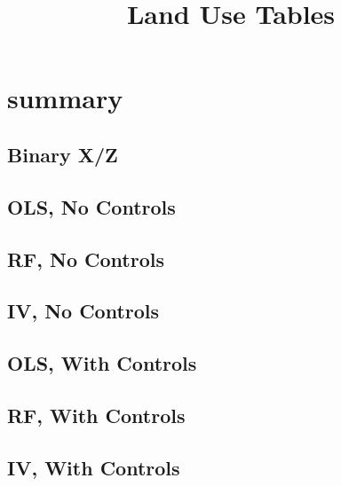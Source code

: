 \documentclass{article}
\title{Land Use Tables}
\begin{document}
\maketitle
\tableofcontents
{\footnotesize 
\listoffigures
\listoftables}
\clearpage


\section{summary}

\begin{table}[htbp]
\footnotesize
\centering {} 

 \label{tab:muni_outcomes_rf}
 \end{table}
\begin{landscape}

\section{Binary X/Z}
\subsection{OLS, No Controls}

\clearpage
\subsection{RF, No Controls}

\clearpage
\subsection{IV, No Controls}

\clearpage

\subsection{OLS, With Controls}

\clearpage
\subsection{RF, With Controls}

\clearpage
\subsection{IV, With Controls}

\clearpage


\end{landscape}
\end{document}
